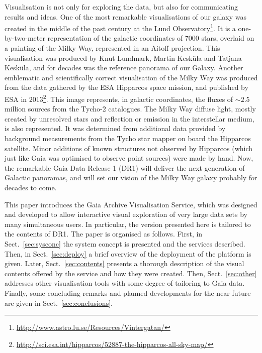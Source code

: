 \documentclass[longauth, final]{aa}
\begin{document}
Visualisation is not only for exploring the data, but also for communicating results and ideas. 
One of the most remarkable visualisations of our galaxy was created in the middle of the past century at the Lund Observatory\footnote{\url{http://www.astro.lu.se/Resources/Vintergatan/}}. It is a one-by-two-meter representation of the galactic coordinates of 7000 stars, overlaid on a painting of the Milky Way, represented in an Aitoff projection. This visualisation was produced by Knut Lundmark, Martin  Kesk\"ula and Tatjana Kesk\"ula, and for decades was the reference panorama of our Galaxy. 
Another emblematic and scientifically correct visualisation of the Milky Way was produced from the data gathered by the ESA Hipparcos space mission, and published by ESA in 2013\footnote{\url{http://sci.esa.int/hipparcos/52887-the-hipparcos-all-sky-map/}}. This image represents, in  galactic coordinates, the fluxes of $\sim2.5$ million sources from the Tycho-2 catalogues. The Milky Way diffuse light, mostly created by unresolved stars and reflection or emission in the interstellar medium,  is also represented. It was determined from additional data provided by background measurements from the Tycho star mapper on board  the Hipparcos satellite. Minor additions of known structures not observed by Hipparcos (which just like Gaia was optimised to observe point sources) were made by hand. 
Now, the remarkable Gaia Data Release 1 (DR1) will deliver the next generation of Galactic panoramas, and will set our vision of the Milky Way galaxy  probably for decades to come.

This paper introduces the Gaia Archive Visualisation Service, which was designed and developed to  allow interactive visual exploration of very large data sets by many simultaneous users. In particular, the  version  presented here is tailored to the contents of DR1.
 The paper is organised as follows. First, in Sect.~\ref{sec:sysconc} the system concept is presented and the services described. Then, in Sect.~\ref{sec:deploy} a brief overview of the deployment of the platform is given. Later, Sect.~\ref{sec:contents} presents a thorough description of the visual contents offered by the service and how they were created. Then, Sect.~\ref{sec:other} addresses other visualisation tools with some degree of tailoring to Gaia data. Finally, some concluding remarks and planned developments for the near future are given in Sect.~\ref{sec:conclusions}.
\end{document}
